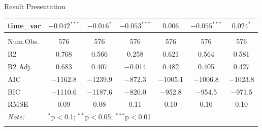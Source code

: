 \documentclass[aspectratio=169,handout, 10pt]{beamer}
\begin{document}
\begin{frame}{Result Presentation}
\begin{longtable}{@{\extracolsep{5pt}}lcccccc}
time\_var           & $-0.042^{***}$ & $-0.016^{*}$   & $-0.053^{***}$ & $0.006$        & $-0.055^{***}$ & $0.024^{*}$   \\
 \hline\\
Num.Obs. & \num{576} & \num{576} & \num{576} & \num{576} & \num{576} & \num{576}\\
R2 & \num{0.768} & \num{0.566} & \num{0.258} & \num{0.621} & \num{0.564} & \num{0.581}\\
R2 Adj. & \num{0.683} & \num{0.407} & \num{-0.014} & \num{0.482} & \num{0.405} & \num{0.427}\\
AIC & \num{-1162.8} & \num{-1239.9} & \num{-872.3} & \num{-1005.1} & \num{-1006.8} & \num{-1023.8}\\
BIC & \num{-1110.6} & \num{-1187.6} & \num{-820.0} & \num{-952.8} & \num{-954.5} & \num{-971.5}\\
RMSE & \num{0.09} & \num{0.08} & \num{0.11} & \num{0.10} & \num{0.10} & \num{0.10}\\
\hline 
\hline
\textit{Note:}  & \multicolumn{3}{r}{$^{*}$p$<$0.1; $^{**}$p$<$0.05; $^{***}$p$<$0.01} \\
\label{table:FE_RQ1}
\end{longtable}


    
\end{frame}
\end{document}
